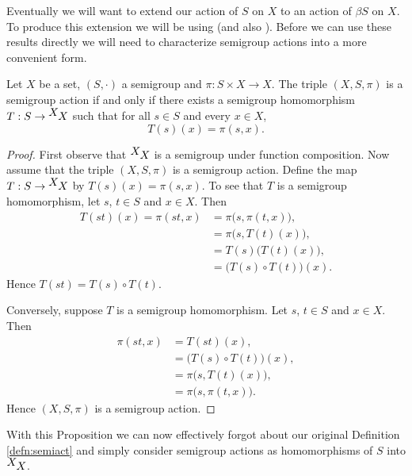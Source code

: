 Eventually we will want to extend our action of $S$ on $X$ to an
action of $\beta S$ on $X$.
To produce this extension we will be using \cite[Lemma
3.30]{Hindman:1998fk} (and also \cite[Corollary
4.22]{Hindman:1998fk}). 
Before we can use these results directly we will need to characterize
semigroup actions into a more convenient form. 

  \begin{prop} 
    \label{prop:semiact}
    Let $X$ be a set, $(S,\cdot)$ a semigroup and $\pi : S \times X \to X$.
    The triple $(X, S, \pi)$ is a semigroup action if and only if
    there exists a semigroup homomorphism $T : S \to \hbox{${}^{\hbox{$X$}}\hskip -1 pt X$}$ such
    that for all $s \in S$ and every $x \in X$,
      \[ T(s)(x) = \pi(s,x). \]
  \end{prop}
  \begin{proof}
    First observe that $\hbox{${}^{\hbox{$X$}}\hskip -1 pt X$}$ is a semigroup under function composition.
    Now assume that the triple $(X, S, \pi)$ is a semigroup action. 
    Define the map $T : S \to \hbox{${}^{\hbox{$X$}}\hskip -1 pt X$}$ by $T(s)(x) =
    \pi(s,x)$.
    To see that $T$ is a semigroup homomorphism, let $s$, $t \in S$
    and $x \in X$. 
    Then 
      \begin{align*}
        T(st)(x) = \pi(st,x) &= \pi\bigl(s, \pi(t,x)\bigr), \\
        &= \pi\bigl(s, T(t)(x)\bigr), \\
        &= T(s)\bigl(T(t)(x)\bigr), \\
        &= \bigl(T(s) \circ T(t)\bigr) (x).
      \end{align*}
    Hence $T(st) = T(s) \circ T(t)$.

    Conversely, suppose $T$ is a semigroup homomorphism. 
    Let $s$, $t \in S$ and $x \in X$.
    Then 
      \begin{align*}
        \pi(st, x) &= T(st)(x), \\
        &= \bigl(T(s) \circ T(t)\bigr) (x), \\
        &= \pi\bigl(s, T(t)(x)\bigr), \\
        &= \pi\bigl(s, \pi(t,x)\bigr).
      \end{align*}
    Hence $(X, S, \pi)$ is a semigroup action.
  \end{proof}

With this Proposition we can now effectively forgot about our original Definition \ref{defn:semiact} and simply consider semigroup actions as homomorphisms of $S$ into $\hbox{${}^{\hbox{$X$}}\hskip -1 pt X$}$. 



